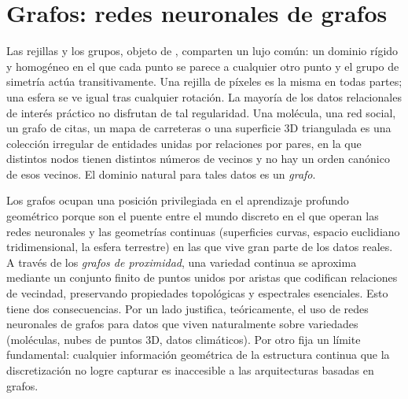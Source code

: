 \providecommand{\N}{\mathbb{N}}
\providecommand{\tr}{\operatorname{tr}}
\providecommand{\Lap}{\mathcal{L}}
\providecommand{\Nbr}{\mathcal{N}}
\providecommand{\HASH}{\operatorname{HASH}}
\providecommand{\WL}{\textsc{wl}}
\providecommand{\Hess}{\operatorname{Hess}}
\providecommand{\dive}{\operatorname{div}}
\providecommand{\grad}{\operatorname{grad}}
\providecommand{\im}{\operatorname{im}}
\providecommand{\rank}{\operatorname{rank}}

\chapter{Grafos: redes neuronales de grafos}
\label{ch:graphs}

Las rejillas y los grupos, objeto de , comparten un
lujo com\'un: un dominio r\'igido y homog\'eneo en el que cada punto se parece a
cualquier otro punto y el grupo de simetr\'ia act\'ua transitivamente. Una
rejilla de p\'ixeles es la misma en todas partes; una esfera se ve igual tras
cualquier rotaci\'on. La mayor\'ia de los datos relacionales de inter\'es
pr\'actico no disfrutan de tal regularidad. Una mol\'ecula, una red social, un
grafo de citas, un mapa de carreteras o una superficie 3D triangulada es una
colecci\'on irregular de entidades unidas por relaciones por pares, en la que
distintos nodos tienen distintos n\'umeros de vecinos y no hay un orden
can\'onico de esos vecinos. El dominio natural para tales datos es un
\emph{grafo}.

Los grafos ocupan una posici\'on privilegiada en el aprendizaje profundo
geom\'etrico porque son el puente entre el mundo discreto en el que operan las
redes neuronales y las geometr\'ias continuas (superficies curvas, espacio
euclidiano tridimensional, la esfera terrestre) en las que vive gran parte de los
datos reales. A trav\'es de los \emph{grafos de proximidad}, una variedad
continua se aproxima mediante un conjunto finito de puntos unidos por aristas que
codifican relaciones de vecindad, preservando propiedades topol\'ogicas y
espectrales esenciales. Esto tiene dos consecuencias. Por un lado justifica,
te\'oricamente, el uso de redes neuronales de grafos para datos que viven
naturalmente sobre variedades (mol\'eculas, nubes de puntos 3D, datos
clim\'aticos). Por otro fija un l\'imite fundamental: cualquier informaci\'on
geom\'etrica de la estructura continua que la discretizaci\'on no logre capturar
es inaccesible a las arquitecturas basadas en grafos.

